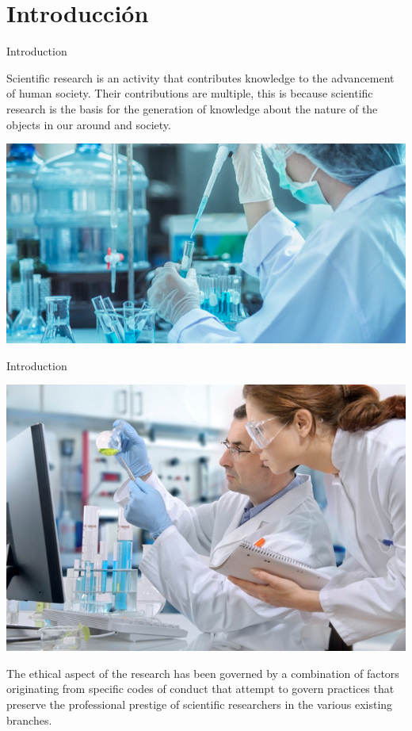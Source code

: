 \section{Introducción}\begin{frame}{Introduction}
    \begin{minipage}{0.4\linewidth}
        Scientific research is an activity that contributes knowledge to the advancement of human society. Their contributions
        are multiple, this is because scientific research is the basis for the generation of knowledge about the nature of the objects in our
        around and society.
    \end{minipage}
    \hspace{0.4cm}
    \begin{minipage}{0.45\linewidth}
        \centering
        \includegraphics[scale=1.2]{images/ima1.jpg}
    \end{minipage}
\end{frame}
\begin{frame}{Introduction}
    \begin{minipage}{0.45\linewidth}    
        \centering
        \includegraphics[scale=0.22]{images/ima2.jpg}
    \end{minipage}
    \hspace{0.4cm}
    \begin{minipage}{0.45\linewidth}
        The ethical aspect of the research has been governed by a combination of factors originating from specific codes of conduct 
that attempt to govern practices that preserve the professional prestige of scientific researchers in the various existing branches.
    \end{minipage}
\end{frame}
